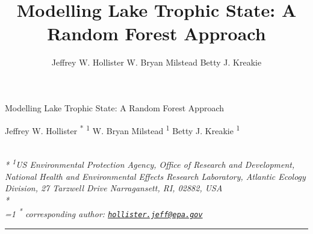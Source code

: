 \documentclass[11pt,]{article}
\title{Modelling Lake Trophic State: A Random Forest Approach}
\author{
Jeffrey W. Hollister
W. Bryan Milstead
Betty J. Kreakie
}
\date{}
\begin{document}
\begin{singlespace}
\begin{center}
\huge Modelling Lake Trophic State: A Random Forest Approach
\end{center}
\begin{center}
\large
Jeffrey W. Hollister \textsuperscript{*} \textsuperscript{1} 
W. Bryan Milstead \textsuperscript{1} 
Betty J. Kreakie \textsuperscript{1} 
\end{center}
\begin{justify}
\footnotesize \emph{ 
\\*
\textsuperscript{1}US Environmental Protection Agency, Office of Research and Development,
National Health and Environmental Effects Research Laboratory, Atlantic
Ecology Division, 27 Tarzwell Drive Narragansett, RI, 02882, USA\\*
}
\setcounter{num}{1}
\\[0.1cm]
\footnotesize \emph{ 
\ifnum\value{num}=1%
\textsuperscript{*} corresponding author:
\fi
\href{mailto:hollister.jeff@epa.gov}{\nolinkurl{hollister.jeff@epa.gov}}
}
\end{justify}
\normalsize

\end{singlespace}


\singlespace

\vspace{2mm}

\hrule
\end{document}
